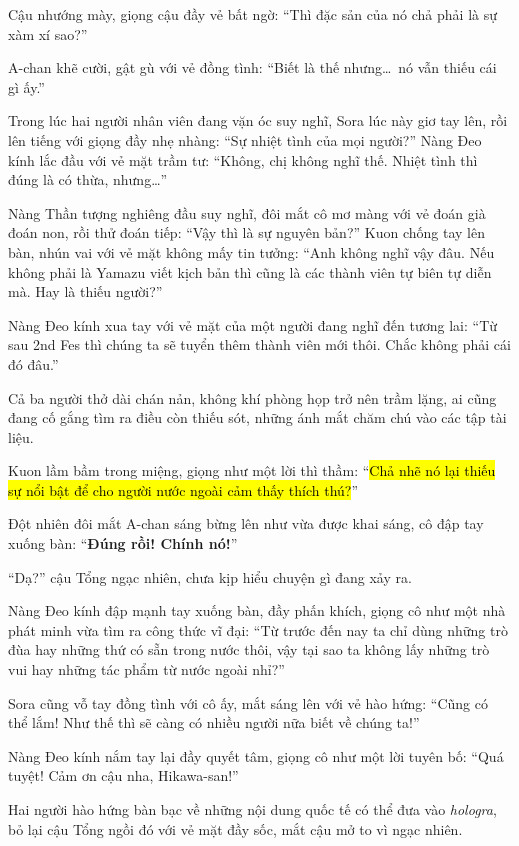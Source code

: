 \documentclass[../main.tex]{subfiles}
\begin{document}
Cậu nhướng mày, giọng cậu đầy vẻ bất ngờ: ``Thì đặc sản của nó chả phải là sự xàm xí sao?''

A-chan khẽ cười, gật gù với vẻ đồng tình: ``Biết là thế nhưng\dots\ nó vẫn thiếu cái gì ấy.''

Trong lúc hai người nhân viên đang vặn óc suy nghĩ, Sora lúc này giơ tay lên, rồi lên tiếng với giọng đầy nhẹ nhàng: ``Sự nhiệt tình của mọi người?'' Nàng Đeo kính lắc đầu với vẻ mặt trầm tư: ``Không, chị không nghĩ thế. Nhiệt tình thì đúng là có thừa, nhưng\dots''

Nàng Thần tượng nghiêng đầu suy nghĩ, đôi mắt cô mơ màng với vẻ đoán già đoán non, rồi thử đoán tiếp: ``Vậy thì là sự nguyên bản?'' Kuon chống tay lên bàn, nhún vai với vẻ mặt không mấy tin tưởng: ``Anh không nghĩ vậy đâu. Nếu không phải là Yamazu viết kịch bản thì cũng là các thành viên tự biên tự diễn mà. Hay là thiếu người?''

Nàng Đeo kính xua tay với vẻ mặt của một người đang nghĩ đến tương lai: ``Từ sau 2nd Fes thì chúng ta sẽ tuyển thêm thành viên mới thôi. Chắc không phải cái đó đâu.''

Cả ba người thở dài chán nản, không khí phòng họp trở nên trầm lặng, ai cũng đang cố gắng tìm ra điều còn thiếu sót, những ánh mắt chăm chú vào các tập tài liệu.

Kuon lầm bầm trong miệng, giọng như một lời thì thầm: ``\hl{Chả nhẽ nó lại thiếu sự nổi bật để cho người nước ngoài cảm thấy thích thú?}''

Đột nhiên đôi mắt A-chan sáng bừng lên như vừa được khai sáng, cô đập tay xuống bàn: ``\textbf{Đúng rồi! Chính nó!}''

``Dạ?'' cậu Tổng ngạc nhiên, chưa kịp hiểu chuyện gì đang xảy ra.

Nàng Đeo kính đập mạnh tay xuống bàn, đầy phấn khích, giọng cô như một nhà phát minh vừa tìm ra công thức vĩ đại: ``Từ trước đến nay ta chỉ dùng những trò đùa hay những thứ có sẵn trong nước thôi, vậy tại sao ta không lấy những trò vui hay những tác phẩm từ nước ngoài nhỉ?''

Sora cũng vỗ tay đồng tình với cô ấy, mắt sáng lên với vẻ hào hứng: ``Cũng có thể lắm! Như thế thì sẽ càng có nhiều người nữa biết về chúng ta!''

Nàng Đeo kính nắm tay lại đầy quyết tâm, giọng cô như một lời tuyên bố: ``Quá tuyệt! Cảm ơn cậu nha, Hikawa-san!''

Hai người hào hứng bàn bạc về những nội dung quốc tế có thể đưa vào \textit{hologra}, bỏ lại cậu Tổng ngồi đó với vẻ mặt đầy sốc, mắt cậu mở to vì ngạc nhiên.
\end{document}
